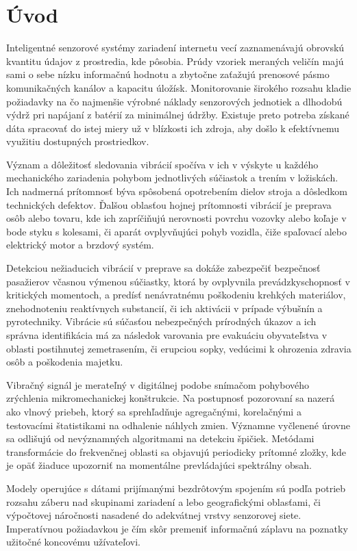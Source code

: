 \chapter{Úvod}
Inteligentné senzorové systémy zariadení internetu vecí zaznamenávajú obrovskú kvantitu údajov z prostredia, kde
pôsobia. Prúdy vzoriek meraných veličín majú sami o sebe nízku informačnú hodnotu a zbytočne zaťažujú
prenosové pásmo komunikačných kanálov a kapacitu úložísk. Monitorovanie širokého rozsahu kladie požiadavky
na čo najmenšie výrobné náklady senzorových jednotiek a dlhodobú výdrž pri napájaní z batérií za minimálnej údržby.
Existuje preto potreba získané dáta spracovať do istej miery už v blízkosti ich zdroja, aby došlo k efektívnemu
využitiu dostupných prostriedkov.

Význam a dôležitosť sledovania vibrácií spočíva v ich v výskyte u každého mechanického zariadenia pohybom jednotlivých súčiastok
a trením v ložiskách. Ich nadmerná prítomnosť býva spôsobená opotrebením dielov stroja a dôsledkom technických defektov. 
Ďalšou oblasťou hojnej prítomnosti vibrácií je preprava osôb alebo tovaru, kde ich zapríčiňujú nerovnosti povrchu vozovky 
alebo koľaje v bode styku s kolesami, či aparát ovplyvňujúci pohyb vozidla, čiže spaľovací alebo elektrický motor a brzdový systém.

Detekciou nežiaducich vibrácií v preprave sa dokáže zabezpečiť bezpečnosť pasažierov včasnou výmenou súčiastky,
ktorá by ovplyvnila prevádzkyschopnosť v kritických momentoch, a predísť nenávratnému poškodeniu krehkých materiálov,
znehodnoteniu reaktívnych substancií, či ich aktivácii v prípade výbušnín a pyrotechniky. Vibrácie sú súčasťou
nebezpečných prírodných úkazov a ich správna identifikácia má za následok varovania pre evakuáciu obyvateľstva
v oblasti postihnutej zemetrasením, či erupciou sopky, vedúcimi k ohrozenia zdravia osôb a poškodenia majetku.

Vibračný signál je merateľný v digitálnej podobe snímačom pohybového zrýchlenia mikromechanickej konštrukcie. 
Na postupnosť pozorovaní sa nazerá ako vlnový priebeh, ktorý sa sprehľadňuje agregačnými, korelačnými a testovacími štatistikami
na odhalenie náhlych zmien. Významne vyčlenené úrovne sa odlišujú od nevýznamných algoritmami na detekciu špičiek.
Metódami transformácie do frekvenčnej oblasti sa objavujú periodicky prítomné zložky, kde je opäť žiaduce upozorniť 
na momentálne prevládajúci spektrálny obsah. 

Modely operujúce s dátami prijímanými bezdrôtovým spojením sú podľa potrieb rozsahu záberu nad skupinami zariadení a
lebo geografickými oblasťami, či výpočtovej náročnosti nasadené do adekvátnej vrstvy senzorovej siete. Imperatívnou 
požiadavkou je čím skôr premeniť informačnú záplavu na poznatky užitočné koncovému užívateľovi.

